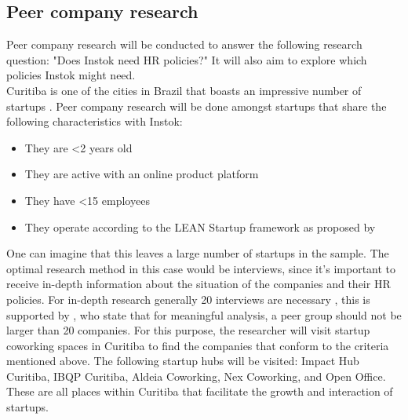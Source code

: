 \documentclass[man]{apa6}
\begin{document}
\subsection{Peer company research}
Peer company research will be conducted to answer the following research question: "Does Instok need HR policies?" It will also aim to explore which policies Instok might need.\\

Curitiba is one of the cities in Brazil that boasts an impressive number of startups \parencite{SANTANA2016}. Peer company research will be done amongst startups that share the following characteristics with Instok:
\begin{itemize}
\item They are <2 years old
\item They are active with an online product platform
\item They have <15 employees
\item They operate according to the LEAN Startup framework as proposed by \cite{RIES2011}
\end{itemize}

One can imagine that this leaves a large number of startups in the sample. The optimal research method in this case would be interviews, since it's important to receive in-depth information about the situation of the companies and their HR policies. For in-depth research generally 20 interviews are necessary \parencite{BAKEREDWARDS2012}, this is supported by \cite{SNL2013}, who state that for meaningful analysis, a peer group should not be larger than 20 companies. For this purpose, the researcher will visit startup coworking spaces in Curitiba to find the companies that conform to the criteria mentioned above. The following startup hubs will be visited: Impact Hub Curitiba, IBQP Curitiba, Aldeia Coworking, Nex Coworking, and Open Office. These are all places within Curitiba that facilitate the growth and interaction of startups. \\
\end{document}

